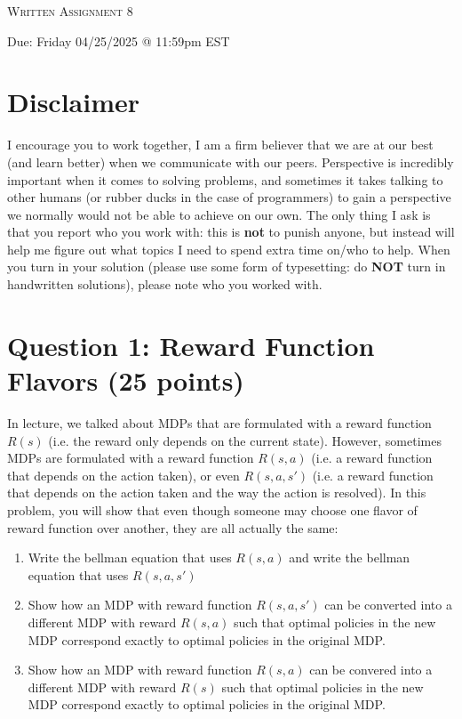 \documentclass[11pt]{article}
\newcommand{\question}[1]{\section*{\normalsize #1}}
\begin{document}
\begin{center}
    {\Large \textsc{Written Assignment 8}}
\end{center}
\begin{center}
    Due: Friday 04/25/2025 @ 11:59pm EST
\end{center}

\section*{\textbf{Disclaimer}}
I encourage you to work together, I am a firm believer that we are at our best (and learn better) when we communicate with our peers. Perspective is incredibly important when it comes to solving problems, and sometimes it takes talking to other humans (or rubber ducks in the case of programmers) to gain a perspective we normally would not be able to achieve on our own. The only thing I ask is that you report who you work with: this is \textbf{not} to punish anyone, but instead will help me figure out what topics I need to spend extra time on/who to help. When you turn in your solution (please use some form of typesetting: do \textbf{NOT} turn in handwritten solutions), please note who you worked with.\newline



\question{Question 1: Reward Function Flavors (25 points)}
In lecture, we talked about MDPs that are formulated with a reward function $R(s)$ (i.e. the reward only depends on the current state). However, sometimes MDPs are formulated with a reward function $R(s,a)$ (i.e. a reward function that depends on the action taken), or even $R(s,a,s')$ (i.e. a reward function that depends on the action taken and the way the action is resolved). In this problem, you will show that even though someone may choose one flavor of reward function over another, they are all actually the same:
\begin{enumerate}
    \item Write the bellman equation that uses $R(s,a)$ and write the bellman equation that uses $R(s,a,s')$
    \item Show how an MDP with reward function $R(s,a,s')$ can be converted into a different MDP with reward $R(s,a)$ such that optimal policies in the new MDP correspond exactly to optimal policies in the original MDP.
    \item Show how an MDP with reward function $R(s,a)$ can be convered into a different MDP with reward $R(s)$ such that optimal policies in the new MDP correspond exactly to optimal policies in the original MDP.
\end{enumerate}
\newpage
\end{document}
